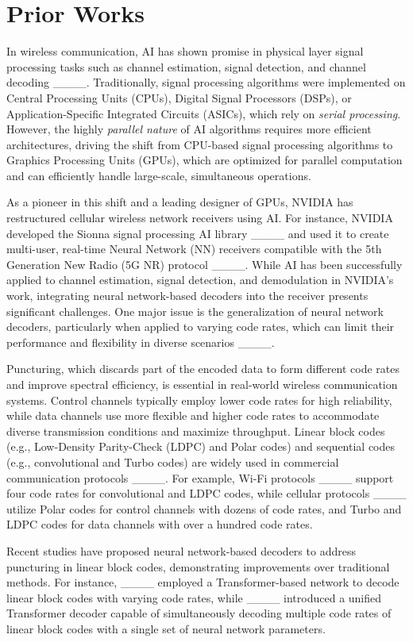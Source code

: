 \section{Prior Works}
In wireless communication, AI has shown promise in physical layer signal processing tasks such as channel estimation, signal detection, and channel decoding ____. Traditionally, signal processing algorithms were implemented on Central Processing Units (CPUs), Digital Signal Processors (DSPs), or Application-Specific Integrated Circuits (ASICs), which rely on \textit{serial processing}. However, the highly \textit{parallel nature} of AI algorithms requires more efficient architectures, driving the shift from CPU-based signal processing algorithms to Graphics Processing Units (GPUs), which are optimized for parallel computation and can efficiently handle large-scale, simultaneous operations.

As a pioneer in this shift and a leading designer of GPUs, NVIDIA has restructured cellular wireless network receivers using AI. For instance, NVIDIA developed the Sionna signal processing AI library ____ and used it to create multi-user, real-time Neural Network (NN) receivers compatible with the 5th Generation New Radio (5G NR) protocol ____. While AI has been successfully applied to channel estimation, signal detection, and demodulation in NVIDIA’s work, integrating neural network-based decoders into the receiver presents significant challenges. One major issue is the generalization of neural network decoders, particularly when applied to varying code rates, which can limit their performance and flexibility in diverse scenarios ____.

Puncturing, which discards part of the encoded data to form different code rates and improve spectral efficiency, is essential in real-world wireless communication systems. Control channels typically employ lower code rates for high reliability, while data channels use more flexible and higher code rates to accommodate diverse transmission conditions and maximize throughput. Linear block codes (e.g., Low-Density Parity-Check (LDPC) and Polar codes) and sequential codes (e.g., convolutional and Turbo codes) are widely used in commercial communication protocols ____. For example, Wi-Fi protocols ____ support four code rates for convolutional and LDPC codes, while cellular protocols ____ utilize Polar codes for control channels with dozens of code rates, and Turbo and LDPC codes for data channels with over a hundred code rates.

Recent studies have proposed neural network-based decoders to address puncturing in linear block codes, demonstrating improvements over traditional methods. For instance, ____ employed a Transformer-based network to decode linear block codes with varying code rates, while ____ introduced a unified Transformer decoder capable of simultaneously decoding multiple code rates of linear block codes with a single set of neural network parameters.


